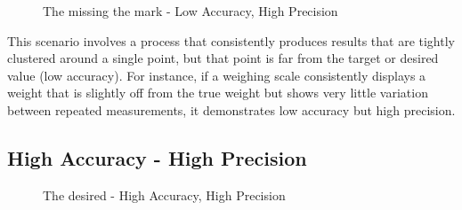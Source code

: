 \documentclass[
  a4paper,
]{scrbook}
\begin{document}
\begin{figure}[H]


\caption{\label{fig-lahp}The missing the mark - Low Accuracy, High
Precision}

\end{figure}%

This scenario involves a process that consistently produces results that
are tightly clustered around a single point, but that point is far from
the target or desired value (low accuracy). For instance, if a weighing
scale consistently displays a weight that is slightly off from the true
weight but shows very little variation between repeated measurements, it
demonstrates low accuracy but high precision.

\subsection{High Accuracy - High
Precision}\label{high-accuracy---high-precision}

\begin{figure}[H]


\caption{\label{fig-hahp}The desired - High Accuracy, High Precision}

\end{figure}%
\end{document}
